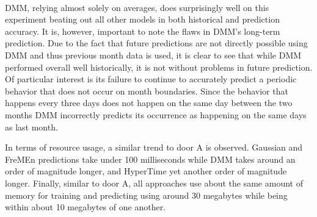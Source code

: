 \begin{table}[h!]
  \centering
  \caption{Door B Data Overview}
\end{table} \\

DMM, relying almost solely on averages, does surprisingly well on this
experiment beating out all other models in both historical and prediction
accuracy.  It is, however, important to note the flaws in DMM's long-term
prediction. Due to the fact that future predictions are not directly possible
using DMM and thus previous month data is used, it is clear to see that
while DMM performed overall well historically, it is not without problems
in future prediction.  Of particular interest is its failure to continue to
accurately predict a periodic behavior that does not occur on month
boundaries. Since the behavior that happens every three days does not happen
on the same day between the two months DMM incorrectly predicts its
occurrence as happening on the same days as last month.

In terms of resource usage, a similar trend to door A is observed. Gaussian
and FreMEn predictions take under 100 milliseconds while DMM takes around
an order of magnitude longer, and HyperTime yet another order of magnitude
longer. Finally, similar to door A, all approaches use about the same amount
of memory for training and predicting using around 30 megabytes while being
within about 10 megabytes of one another.

